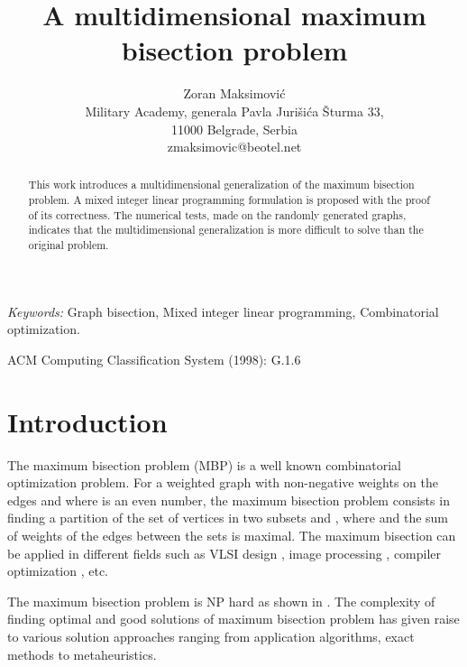 \documentclass[10pt]{article}
\begin{document}
\label{firstpage}



\title{A multidimensional maximum bisection problem
}




\author{Zoran Maksimovi\'c \\
Military Academy, generala Pavla Juri\v{s}i\'{c}a \v{S}turma 33, \\11000 Belgrade, Serbia \\
zmaksimovic@beotel.net
}






\maketitle


\begin{abstract}
This work introduces a multidimensional generalization of the maximum bisection problem. A mixed integer linear
programming formulation is proposed with the proof 
of its correctness. The numerical tests, made on the randomly generated graphs, indicates that the multidimensional
generalization is more difficult to solve than the original problem. 
 
\end{abstract}

{\em Keywords:} Graph bisection, Mixed integer linear programming, Combinatorial
optimization.

ACM Computing Classification System (1998): G.1.6



\section{Introduction}

The maximum bisection problem (MBP) is a well known combinatorial optimization problem.
For a weighted graph  with non-negative weights on the edges and where  is an even number, 
the maximum bisection problem  consists in finding 
a partition of the set of vertices  in two subsets  and , where  and the sum of weights of the edges 
between the sets is maximal. The maximum bisection can be applied in different fields such 
as VLSI design \cite{slov}, image processing \cite{shij},  compiler optimization \cite{hand}, etc. 

The maximum bisection problem is NP hard as shown in \cite{garr}. 
The complexity of finding optimal and good solutions of maximum bisection problem 
has given raise to various solution approaches ranging from application algorithms, exact methods to metaheuristics. 
\end{document}

